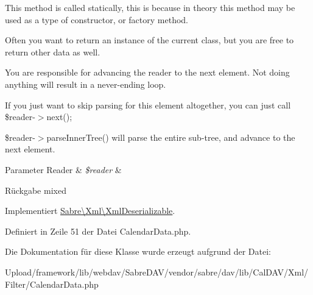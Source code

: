 This method is called statically, this is because in theory this method may be used as a type of constructor, or factory method.

Often you want to return an instance of the current class, but you are free to return other data as well.

You are responsible for advancing the reader to the next element. Not doing anything will result in a never-\/ending loop.

If you just want to skip parsing for this element altogether, you can just call \$reader-\/$>$next();

\$reader-\/$>$parse\+Inner\+Tree() will parse the entire sub-\/tree, and advance to the next element.


\begin{DoxyParams}[1]{Parameter}
Reader & {\em \$reader} & \\
\hline
\end{DoxyParams}
\begin{DoxyReturn}{Rückgabe}
mixed 
\end{DoxyReturn}


Implementiert \mbox{\hyperlink{interface_sabre_1_1_xml_1_1_xml_deserializable_a19e0eca545b9a0d93f7d6b69085ade30}{Sabre\textbackslash{}\+Xml\textbackslash{}\+Xml\+Deserializable}}.



Definiert in Zeile 51 der Datei Calendar\+Data.\+php.



Die Dokumentation für diese Klasse wurde erzeugt aufgrund der Datei\+:\begin{DoxyCompactItemize}
\item 
Upload/framework/lib/webdav/\+Sabre\+D\+A\+V/vendor/sabre/dav/lib/\+Cal\+D\+A\+V/\+Xml/\+Filter/Calendar\+Data.\+php\end{DoxyCompactItemize}
